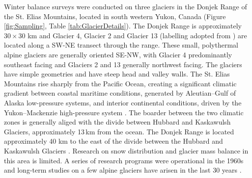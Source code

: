 \documentclass[twocolumn, letterpaper]{igs}
\begin{document}
Winter balance surveys were conducted on three glaciers in the Donjek Range of the St. Elias Mountains, located in south western Yukon, Canada (Figure \ref{fig:Sampling}, Table \ref{tab:GlacierDetails}). The Donjek Range is approximately $30\times30$ km and Glacier 4, Glacier 2 and Glacier 13 (labelling adopted from \cite{Crompton2016}) are located along a SW-NE transect through the range. These small, polythermal alpine glaciers are generally oriented SE-NW, with Glacier 4 predominantly southeast facing and Glaciers 2 and 13 generally northwest facing. The glaciers have simple geometries and have steep head and valley walls. The St. Elias Mountains rise sharply from the Pacific Ocean, creating a significant climatic gradient between coastal maritime conditions, generated by Aleutian--Gulf of Alaska low-pressure systems, and interior continental conditions, driven by the Yukon--Mackenzie high-pressure system \citep{Taylor1969}. The boarder between the two climatic zones is generally aliged with the divide between Hubbard and Kaskawulsh Glaciers, approximately 13\,km from the ocean. The Donjek Range is located approximately 40 km to the east of the divide between the Hubbard and Kaskawulsh Glaciers \citep{Taylor1969}. Research on snow distribution and glacier mass balance in this area is limited. A series of research programs were operational in the 1960s \citep{Wood1948, Danby2003} and long-term studies on a few alpine glaciers have arisen in the last 30 years \citep[e.g.][]{Flowers2014}.
\end{document}
